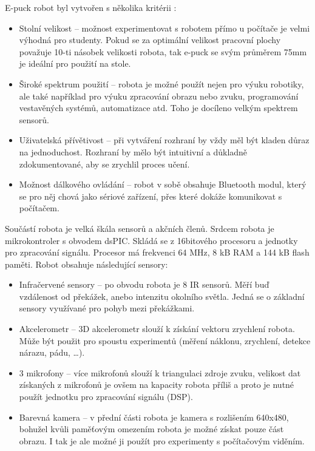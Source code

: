 \documentclass[12pt,notitlepage]{report}
\begin{document}
    E-puck robot byl vytvořen s několika kritérii \cite{bonani}:
    \begin{itemize}
        \item Stolní velikost -- možnost experimentovat s robotem přímo u
        počítače je velmi výhodná pro studenty. Pokud se za optimální velikost
        pracovní plochy považuje 10-ti násobek velikosti robota, tak e-puck se
        svým průměrem 75mm je ideální pro použití na stole.

        \item Široké spektrum použití -- robota je možné použít nejen pro výuku
        robotiky, ale také například pro výuku zpracování obrazu nebo zvuku,
        programování vestavěných systémů, automatizace atd. Toho je docíleno
        velkým spektrem sensorů.

        \item Uživatelská přívětivost -- při vytváření rozhraní by vždy měl být
        kladen důraz na jednoduchost. Rozhraní by mělo být intuitivní a
        důkladně zdokumentované, aby se zrychlil proces učení.

        \item Možnost dálkového ovládání -- robot v sobě obsahuje Bluetooth
        modul, který se pro něj chová jako sériové zařízení, přes které dokáže
        komunikovat s počítačem.
    \end{itemize}

    Součástí robota je velká škála sensorů a akčních členů. Srdcem robota je
    mikrokontroler s obvodem dsPIC. Skládá se z 16bitového procesoru a jednotky
    pro zpracování signálu. Procesor má frekvenci 64 MHz, 8 kB RAM a 144 kB
    flash paměti. Robot obsahuje následující sensory:

    \begin{itemize}
        \item Infračervené sensory -- po obvodu robota je 8 IR sensorů. Měří
        buď vzdálenost od překážek, anebo intenzitu okolního světla. Jedná se o
        základní sensory využívané pro pohyb mezi překážkami.

        \item Akcelerometr -- 3D akcelerometr slouží k získání vektoru
        zrychlení robota. Může být použit pro spoustu experimentů (měření
        náklonu, zrychlení, detekce nárazu, pádu, \ldots).

        \item 3 mikrofony -- více mikrofonů slouží k triangulaci zdroje zvuku,
        velikost dat získaných z mikrofonů je ovšem na kapacity robota příliš a
        proto je nutné použít jednotku pro zpracování signálu (DSP).

        \item Barevná kamera -- v přední části robota je kamera s rozlišením
        640x480, bohužel kvůli paměťovým omezením robota je možné získat pouze
        část obrazu. I tak je ale možné ji použít pro experimenty s počítačovým
        viděním.
    \end{itemize}
\end{document}
